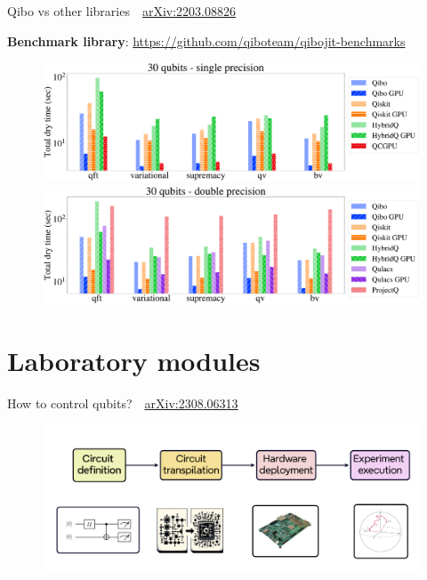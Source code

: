 \documentclass[aspectratio=169, 8pt, xcolor={svgnames}, hyperref={linkcolor=black}]{beamer}
\begin{document}
 \begin{frame}{Qibo vs other libraries \hfill \faBook\,\, \href{https://arxiv.org/abs/2203.08826}{arXiv:2203.08826}}

   {\small {\bf Benchmark library}: \url{https://github.com/qiboteam/qibojit-benchmarks} }

   \begin{figure}
     \includegraphics[scale=0.15]{figures/libraries_single_30qubits_total_dry_time.pdf}
     \includegraphics[scale=0.15]{figures/libraries_double_30qubits_total_dry_time.pdf}
   \end{figure}

 \end{frame}

\section{Laboratory modules}

\begin{frame}{How to control qubits?  \hfill \faBook\,\, \href{https://arxiv.org/abs/2308.06313}{arXiv:2308.06313}}
  \begin{figure}
    \includegraphics[width=\textwidth]{figures/algorithmdeployment.png}
  \end{figure}
\end{frame}
\end{document}
